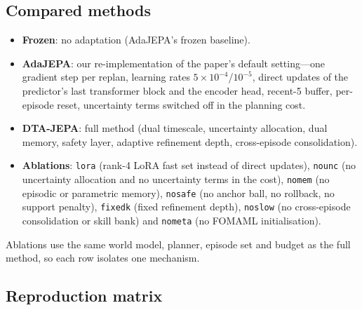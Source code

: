 \subsection{Compared methods}

\begin{itemize}[leftmargin=1.2em,itemsep=2pt]
\item \textbf{Frozen}: no adaptation (AdaJEPA's frozen baseline).
\item \textbf{AdaJEPA}: our re-implementation of the paper's default setting---one gradient
step per replan, learning rates $5\times10^{-4}$/$10^{-5}$, direct updates of the predictor's
last transformer block and the encoder head, recent-5 buffer, per-episode reset, uncertainty
terms switched off in the planning cost.
\item \textbf{DTA-JEPA}: full method (dual timescale, uncertainty allocation, dual memory,
safety layer, adaptive refinement depth, cross-episode consolidation).
\item \textbf{Ablations}: \texttt{lora} (rank-4 LoRA fast set instead of direct updates),
\texttt{nounc} (no uncertainty allocation and no uncertainty terms in the cost),
\texttt{nomem} (no episodic or parametric memory), \texttt{nosafe} (no anchor ball, no
rollback, no support penalty), \texttt{fixedk} (fixed refinement depth), \texttt{noslow}
(no cross-episode consolidation or skill bank) and \texttt{nometa} (no FOMAML initialisation).
\end{itemize}

Ablations use the same world model, planner, episode set and budget as the full method, so
each row isolates one mechanism.

\subsection{Reproduction matrix}\label{sec:matrix}

